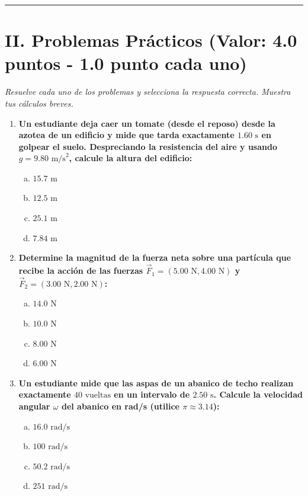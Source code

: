 \documentclass[11pt,a4paper]{article}
\begin{document}
\hrule
\section*{II. Problemas Prácticos (Valor: 4.0 puntos - 1.0 punto cada uno)}
\textit{Resuelve cada uno de los problemas y selecciona la respuesta correcta. Muestra tus cálculos breves.}

\begin{enumerate}
    \item \textbf{Un estudiante deja caer un tomate (desde el reposo) desde la azotea de un edificio y mide que tarda exactamente $1.60 \text{ s}$ en golpear el suelo. Despreciando la resistencia del aire y usando $g = 9.80 \text{ m/s}^2$, calcule la altura del edificio:}
    \begin{enumerate}[a)]
        \item $15.7 \text{ m}$
        \item $12.5 \text{ m}$
        \item $25.1 \text{ m}$
        \item $7.84 \text{ m}$
    \end{enumerate}

    \item \textbf{Determine la magnitud de la fuerza neta sobre una partícula que recibe la acción de las fuerzas $\vec{F}_1 = (5.00 \text{ N}, 4.00 \text{ N})$ y $\vec{F}_2 = (3.00 \text{ N}, 2.00 \text{ N})$:}
    \begin{enumerate}[a)]
        \item $14.0 \text{ N}$
        \item $10.0 \text{ N}$
        \item $8.00 \text{ N}$
        \item $6.00 \text{ N}$
    \end{enumerate}

    \item \textbf{Un estudiante mide que las aspas de un abanico de techo realizan exactamente $40 \text{ vueltas}$ en un intervalo de $2.50 \text{ s}$. Calcule la velocidad angular $\omega$ del abanico en rad/s (utilice $\pi \approx 3.14$):}
    \begin{enumerate}[a)]
        \item $16.0 \text{ rad/s}$
        \item $100 \text{ rad/s}$
        \item $50.2 \text{ rad/s}$
        \item $251 \text{ rad/s}$
    \end{enumerate}


\end{enumerate}
\end{document}
